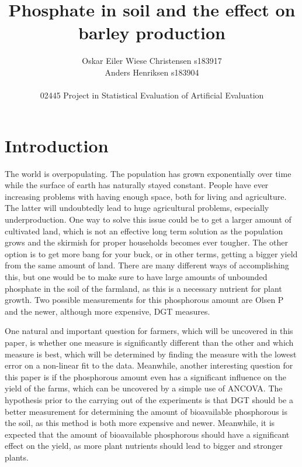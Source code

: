 \documentclass[11pt, fleqn, titlepage]{article}
\title{Phosphate in soil and the effect on barley production}
\author{Oskar Eiler Wiese Christensen s183917 \\ Anders Henriksen s183904 \\ \\ 02445 Project in Statistical Evaluation of Artificial Evaluation}
\date{\today \vspace{2.5cm} \section*{\small Summary} 
\justify{\small Farmers will need more effective agriculture as the population grows. This can be accomplished by optimizing the amount of bioavailable phosphorous in the soil. The purpose of this paper is to analyze if more phosphorous leads to more yield and which measure, Olsen P or DGT, is best for getting the biggest possible yield. A linear and non-linear Michaelis-Mentel model have been fit to the data to find the best possible measurement to use, and ANCOVA has been applied for finding the significance of phosphorous for the yield. These analyses have shown that DGT is the best of the two measurements and that phosphorous has a really significant influence on the harvest yield. This shows that phosphorous measurements can be constructive in helping farmers estimate the yield. Meanwhile, when estimating this, DGT is the better of the measurements, though it also costs more, so farmers should take into consideration the cost-benefit of using DGT instead of Olsen P.}}
\begin{document}
\maketitle

\section{Introduction}
The world is overpopulating. The population has grown exponentially over time while the surface of earth has naturally stayed constant. People have ever increasing problems with having enough space, both for living and agriculture. The latter will undoubtedly lead to huge agricultural problems, especially underproduction. One way to solve this issue could be to get a larger amount of cultivated land, which is not an effective long term solution as the population grows and the skirmish for proper households becomes ever tougher. The other option is to get more bang for your buck, or in other terms, getting a bigger yield from the same amount of land. There are many different ways of accomplishing this, but one would be to make sure to have large amounts of unbounded phosphate in the soil of the farmland, as this is a necessary nutrient for plant growth. Two possible measurements for this phosphorous amount are Olsen P and the newer, although more expensive, DGT measures. 

One natural and important question for farmers, which will be uncovered in this paper, is whether one measure is significantly different than the other and which measure is best, which will be determined by finding the measure with the lowest error on a non-linear fit to the data. Meanwhile, another interesting question for this paper is if the phosphorous amount even has a significant influence on the yield of the farms, which can be uncovered by a simple use of ANCOVA. The hypothesis prior to the carrying out of the experiments is that DGT should be a better measurement for determining the amount of bioavailable phosphorous is the soil, as this method is both more expensive and newer. Meanwhile, it is expected that the amount of bioavailable phosphorous should have a significant effect on the yield, as more plant nutrients should lead to bigger and stronger plants.
\end{document}
